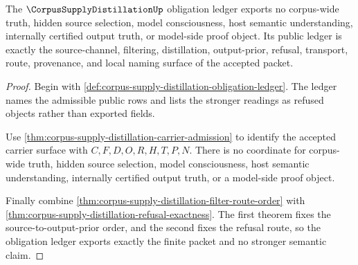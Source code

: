 \begin{theorem}
\label{thm:corpus-supply-distillation-ledger-exactness}
The $\CorpusSupplyDistillationUp$ obligation ledger exports no corpus-wide truth, hidden source selection, model consciousness, host semantic understanding, internally certified output truth, or model-side proof object. Its public ledger is exactly the source-channel, filtering, distillation, output-prior, refusal, transport, route, provenance, and local naming surface of the accepted packet.
\end{theorem}
\begin{proof}
Begin with \autoref{def:corpus-supply-distillation-obligation-ledger}. The ledger names the admissible public rows and lists the stronger readings as refused objects rather than exported fields.

Use \autoref{thm:corpus-supply-distillation-carrier-admission} to identify the accepted carrier surface with $C,F,D,O,R,H,T,P,N$. There is no coordinate for corpus-wide truth, hidden source selection, model consciousness, host semantic understanding, internally certified output truth, or a model-side proof object.

Finally combine \autoref{thm:corpus-supply-distillation-filter-route-order} with \autoref{thm:corpus-supply-distillation-refusal-exactness}. The first theorem fixes the source-to-output-prior order, and the second fixes the refusal route, so the obligation ledger exports exactly the finite packet and no stronger semantic claim.
\end{proof}



